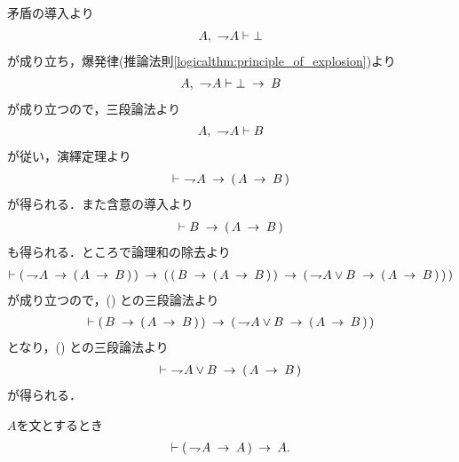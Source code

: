 	\begin{prf}
		矛盾の導入より
		\begin{align}
			A,\ \negation A \vdash \bot
		\end{align}
		が成り立ち，爆発律(推論法則\ref{logicalthm:principle_of_explosion})より
		\begin{align}
			A,\ \negation A \vdash \bot \rarrow B
		\end{align}
		が成り立つので，三段論法より
		\begin{align}
			A,\ \negation A \vdash B
		\end{align}
		が従い，演繹定理より
		\begin{align}
			\vdash\ \negation A \rarrow (\, A \rarrow B\, )
			\label{fom:disjunction_of_negation_rewritable_by_implication_1}
		\end{align}
		が得られる．また含意の導入より
		\begin{align}
			\vdash B \rarrow (\, A \rarrow B\, )
			\label{fom:disjunction_of_negation_rewritable_by_implication_2}
		\end{align}
		も得られる．ところで論理和の除去より
		\begin{align}
			\vdash (\, \negation A \rarrow (\, A \rarrow B\, )\, )
			\rarrow (\, (\, B \rarrow (\, A \rarrow B\, )\, )
			\rarrow (\, \negation A \vee B \rarrow (\, A \rarrow B\, )\, )\, )
		\end{align}
		が成り立つので，()
		との三段論法より
		\begin{align}
			\vdash (\, B \rarrow (\, A \rarrow B\, )\, )
			\rarrow (\, \negation A \vee B \rarrow (\, A \rarrow B\, )\, )
		\end{align}
		となり，()
		との三段論法より
		\begin{align}
			\vdash\ \negation A \vee B \rarrow (\, A \rarrow B\, )
		\end{align}
		が得られる．
		\QED
	\end{prf}
	
	\begin{screen}
		\begin{thm}[驚嘆すべき帰結]\label{logicalthm:consequentia_mirabilis}
			$A$を文とするとき
			\begin{align}
				\vdash (\, \negation A \rarrow A\, ) \rarrow A.
			\end{align}
		\end{thm}
	\end{screen}
	
